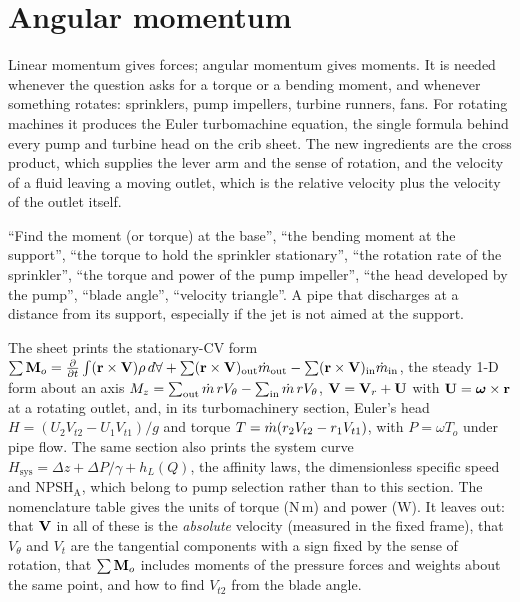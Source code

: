 \section{Angular momentum}
\label{sec:angular}

Linear momentum gives forces; angular momentum gives moments. It is needed whenever the question asks for a torque or a bending moment, and whenever something rotates: sprinklers, pump impellers, turbine runners, fans. For rotating machines it produces the Euler turbomachine equation, the single formula behind every pump and turbine head on the crib sheet. The new ingredients are the cross product, which supplies the lever arm and the sense of rotation, and the velocity of a fluid leaving a moving outlet, which is the relative velocity plus the velocity of the outlet itself.

\begin{recognise}
``Find the moment (or torque) at the base'', ``the bending moment at the support'', ``the torque to hold the sprinkler stationary'', ``the rotation rate of the sprinkler'', ``the torque and power of the pump impeller'', ``the head developed by the pump'', ``blade angle'', ``velocity triangle''. A pipe that discharges at a distance from its support, especially if the jet is not aimed at the support.
\end{recognise}

\begin{onsheet}
The sheet prints the stationary-CV form $\sum\mathbf{M}_o = \frac{\partial }{\partial t}\int(\mathbf{r}\times\mathbf{V})\rho\,d\forall + \sum(\mathbf{r}\times\mathbf{V})_\text{out}\dot m_\text{out} - \sum(\mathbf{r}\times\mathbf{V})_\text{in}\dot m_\text{in}$, the steady 1-D form about an axis $M_z = \sum_\text{out}\dot m\,rV_\theta - \sum_\text{in}\dot m\,rV_\theta$, $\mathbf{V} = \mathbf{V}_r + \mathbf{U}$ with $\mathbf{U} = \boldsymbol\omega\times\mathbf{r}$ at a rotating outlet, and, in its turbomachinery section, Euler's head $H = (U_2V_{t2} - U_1V_{t1})/g$ and torque $T = \dot m(r_2V_{t2} - r_1V_{t1})$, with $P = \omega T_o$ under pipe flow. The same section also prints the system curve $H_\text{sys} = \Delta z + \Delta P/\gamma + h_L(Q)$, the affinity laws, the dimensionless specific speed and $\mathrm{NPSH_A}$, which belong to pump selection rather than to this section. The nomenclature table gives the units of torque ($\mathrm{N\,m}$) and power ($\mathrm{W}$). It leaves out: that $\mathbf{V}$ in all of these is the \emph{absolute} velocity (measured in the fixed frame), that $V_\theta$ and $V_t$ are the tangential components with a sign fixed by the sense of rotation, that $\sum\mathbf{M}_o$ includes moments of the pressure forces and weights about the same point, and how to find $V_{t2}$ from the blade angle.
\end{onsheet}


